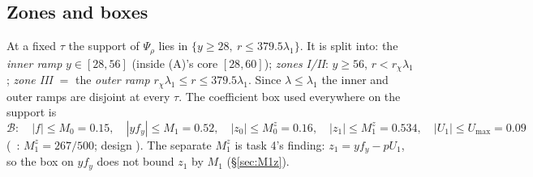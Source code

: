 \documentclass[11pt]{article}
\theoremstyle{definition}\newtheorem{definition}[theorem]{Definition}
\theoremstyle{remark}\newtheorem{remark}[theorem]{Remark}
\newcommand{\fn}[1]{\texttt{\detokenize{#1}}}
\newcommand{\key}[1]{\texttt{\detokenize{#1}}}
\begin{document}
\subsection{Zones and boxes}\label{sec:zones}
At a fixed $\tau$ the support of $\Psi_\rho$ lies in $\{y\ge28,\ r\le379.5\lambda_1\}$. It is split into: the \emph{inner ramp} $y\in[28,56]$ (inside (A)'s core $[28,60]$); \emph{zones I/II}: $y\ge56$, $r<r_\chi\lambda_1$; \emph{zone III} $=$ the \emph{outer ramp} $r_\chi\lambda_1\le r\le379.5\lambda_1$. Since $\lambda\le\lambda_1$ the inner and outer ramps are disjoint at every $\tau$. The coefficient box used everywhere on the support is
\[
\mathcal B:\quad |f|\le M_0=0.15,\quad |yf_y|\le M_1=0.52,\quad |z_0|\le M_0^z=0.16,\quad |z_1|\le M_1^z=0.534,\quad |U_1|\le U_{\max}=0.09
\]
(\SU\ \key{box}: $M_1^z=267/500$; design \fn{data56}). The separate $M_1^z$ is task 4's finding: $z_1=yf_y-pU_1$, so the box on $yf_y$ does not bound $z_1$ by $M_1$ (\S\ref{sec:M1z}).

\end{document}
